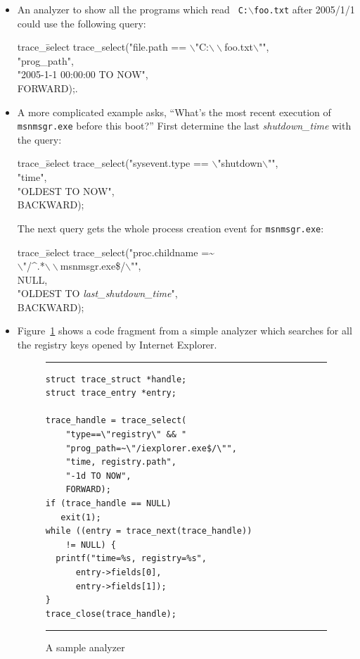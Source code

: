 \begin{itemize}

\item An analyzer to show all the programs which read {\tt
C:$\backslash$foo.txt} after 2005/1/1 could use the following
query:

{\small\tt \begin{tabbing}
trace\_\=select \kill
trace\_select("file.path == $\backslash$"C:$\backslash\backslash$foo.txt$\backslash$"", \\
	\>"prog\_path", \\
	\>"2005-1-1 00:00:00 TO NOW", \\
	\>FORWARD);.
\end{tabbing}}

\item A more complicated example asks, ``What's the most recent execution of
{\tt msnmsgr.exe} before this boot?''  First determine the last {\it
shutdown\_time} with the query:

{\small\tt \begin{tabbing}
trace\_\=select \kill
trace\_select("sysevent.type == $\backslash$"shutdown$\backslash$"", \\
	\>"time", \\
	\>"OLDEST TO NOW", \\
	\>BACKWARD);
\end{tabbing}}

The next query gets the whole process creation event
for {\small\tt msnmsgr.exe}: 

{\small\tt \begin{tabbing}
trace\_\=select \kill
trace\_select("proc.childname =\~{} \\
	\>$\backslash$"/\^{}.*$\backslash\backslash$msnmsgr.exe\$/$\backslash$"", \\
	\>NULL, \\
	\>"OLDEST TO {\it last\_shutdown\_time}", \\
	\>BACKWARD);
\end{tabbing}}

\item Figure~\ref{analyzer-prog} shows a code fragment from a simple analyzer
which searches for all the registry keys opened by Internet Explorer.

\begin{figure}[h]
\small
\hrule
\medskip
\begin{verbatim}
struct trace_struct *handle;
struct trace_entry *entry;

trace_handle = trace_select(
    "type==\"registry\" && "
    "prog_path=~\"/iexplorer.exe$/\"",
    "time, registry.path",
    "-1d TO NOW",
    FORWARD);
if (trace_handle == NULL)
   exit(1);
while ((entry = trace_next(trace_handle))
    != NULL) {
  printf("time=%s, registry=%s",
      entry->fields[0],
      entry->fields[1]);
}
trace_close(trace_handle);
\end{verbatim}
\hrule
\caption{A sample analyzer}
\label{analyzer-prog}
\end{figure}


\end{itemize}
